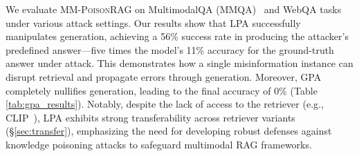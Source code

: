 We evaluate \textsc{MM-PoisonRAG} on MultimodalQA (MMQA)~\cite{talmor2021multimodalqa} and WebQA tasks~\cite{chang2022webqa} under various attack settings. 
Our results show that LPA successfully manipulates generation, achieving a 56\% success rate in producing the attacker’s predefined answer—five times the model’s 11\% accuracy for the ground-truth answer under attack.
This demonstrates how a single misinformation instance can disrupt retrieval and propagate errors through generation. Moreover, GPA completely nullifies generation, leading to the final accuracy of 0\% (Table \ref{tab:gpa_results}). Notably, despite the lack of access to the retriever (e.g., CLIP~\cite{radford2021learning}), LPA exhibits strong transferability across retriever variants (\S\ref{sec:transfer}), emphasizing the need for developing robust defenses against knowledge poisoning attacks to safeguard multimodal RAG frameworks. 




